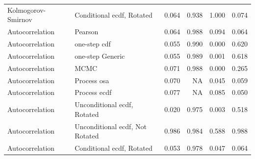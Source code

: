\documentclass[
]{article}
\begin{document}
\begin{table}[H]
\begin{tabular}[t]{llrrrr}
Kolmogorov- Smirnov & Conditional ecdf, Rotated & 0.064 & 0.938 & 1.000 & 0.074\\
Autocorrelation & Pearson & 0.064 & 0.988 & 0.094 & 0.064\\
Autocorrelation & one-step cdf & 0.055 & 0.990 & 0.000 & 0.620\\
\addlinespace
Autocorrelation & one-step Generic & 0.055 & 0.989 & 0.001 & 0.618\\
Autocorrelation & MCMC & 0.071 & 0.988 & 0.000 & 0.265\\
Autocorrelation & Process osa & 0.070 & NA & 0.045 & 0.059\\
Autocorrelation & Process ecdf & 0.077 & NA & 0.085 & 0.050\\
Autocorrelation & Unconditional ecdf, Rotated & 0.020 & 0.975 & 0.003 & 0.518\\
\addlinespace
Autocorrelation & Unconditional ecdf, Not Rotated & 0.986 & 0.984 & 0.588 & 0.988\\
Autocorrelation & Conditional ecdf, Rotated & 0.053 & 0.978 & 0.047 & 0.064\\
\bottomrule
\end{tabular}
\end{table}
\end{document}
